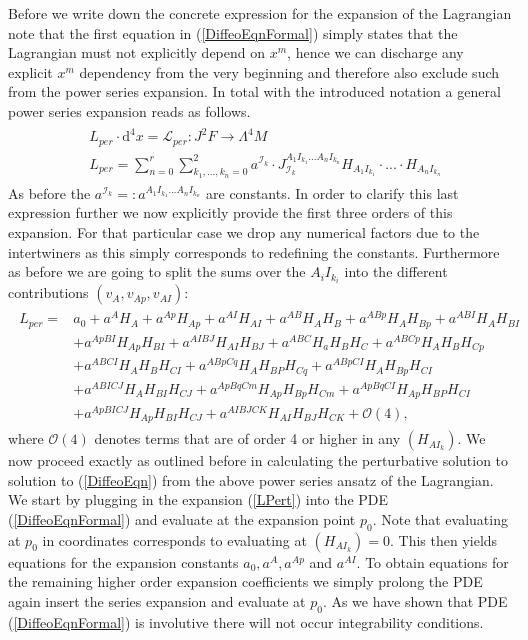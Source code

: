 \documentclass[a4paper,12pt, DIV=14, BCOR=5mm, twoside, headsepline, numbers=noenddot]{scrbook}
\begin{document}
Before we write down the concrete expression for the expansion of the Lagrangian note that the first equation in (\ref{DiffeoEqnFormal}) simply states that the Lagrangian must not explicitly depend on $x^m$, hence we can discharge any explicit $x^m$ dependency from the very beginning and therefore also exclude such from the power series expansion. In total with the introduced notation a general power series expansion reads as follows. 
\begin{align} \label{generalPowerSL}
    \begin{aligned}
    &L_{per} \cdot  \mathrm{d}^4x = \mathcal{L}_{per} : J^2F \longrightarrow \Lambda^4M \\
    &L_{per} = \sum_{n=0}^r \sum_{k_1,...,k_n = 0}^2 a^{\mathcal{I}_k} \cdot J_{\mathcal{I}_k}^{A_1I_{k_1}...A_nI_{k_n}} H_{A_1I_{k_1}} \cdot ... \cdot H_{A_nI_{k_n}}
    \end{aligned}
\end{align}
%
%
As before the $a^{\mathcal{I}_k} =: a^{A_1I_{k_1}...A_nI_{k_n}}$ are constants. 
In order to clarify this last expression further we now explicitly provide the first three orders of this expansion. For that particular case we drop any numerical factors due to the intertwiners as this simply corresponds to redefining the constants. Furthermore as before we are going to split the sums over the ${A_iI_{k_i}}$ into the different contributions $(v_A,v_{Ap},v_{AI})$:
\begin{align}\label{LPert}
\begin{aligned}
    L_{per} = &a_0 + a^A H_A + a^{Ap} H_{Ap} + a^{AI}H_{AI} + a^{AB} H_{A}H_{B} + a^{ABp}H_A H_{Bp} + a^{ABI} H_{A} H_{BI}\\
    &+a^{ApBI}H_{Ap} H_{BI} + a^{AIBJ} H_{AI}H_{BJ} + a^{ABC} H_a H_B H_C 
    + a^{ABCp} H_A H_B H_{Cp} \\
    &+a^{ABCI} H_A H_B H_{CI} + a^{ABpCq} H_{A}H_{BP}H_{Cq} + a^{ABpCI} H_A H_{Bp} H_{CI}\\
    &+ a^{ABICJ} H_A H_{BI}H_{CJ} 
    + a^{ApBqCm} H_{Ap} H_{Bp} H_{Cm}+ a^{ApBq CI} H_{Ap} H_{BP} H_{CI}\\
    &+ a^{Ap BI CJ} H_{Ap} H_{BI} H_{CJ} + a^{AIBJCK} H_{AI} H_{BJ} H_{CK} + \mathcal{O}(4),
\end{aligned}
\end{align}
where $\mathcal{O}(4)$ denotes terms that are of order 4 or higher in any $(H_{AI_k})$. We now proceed exactly as outlined before in calculating the perturbative solution to solution to (\ref{DiffeoEqn}) from the above power series ansatz of the Lagrangian. We start by plugging in the expansion (\ref{LPert}) into the PDE (\ref{DiffeoEqnFormal}) and evaluate at the expansion point $p_0$. Note that evaluating at $p_0$ in coordinates corresponds to evaluating at $(H_{AI_k})=0$. This then yields equations for the expansion constants $a_0, a^A, a^{Ap}$ and $a^{AI}$. To obtain equations for the remaining higher order expansion coefficients we simply prolong the PDE again insert the series expansion and evaluate at $p_0$. As we have shown that PDE (\ref{DiffeoEqnFormal}) is involutive there will not occur integrability conditions.\\
\end{document}
